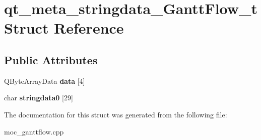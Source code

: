 \hypertarget{structqt__meta__stringdata___gantt_flow__t}{}\section{qt\+\_\+meta\+\_\+stringdata\+\_\+\+Gantt\+Flow\+\_\+t Struct Reference}
\label{structqt__meta__stringdata___gantt_flow__t}
\subsection*{Public Attributes}
\begin{DoxyCompactItemize}
\item 
\hypertarget{structqt__meta__stringdata___gantt_flow__t_a8116996fb3a46fad828986cef0447fb6}{}Q\+Byte\+Array\+Data {\bfseries data} \mbox{[}4\mbox{]}\label{structqt__meta__stringdata___gantt_flow__t_a8116996fb3a46fad828986cef0447fb6}

\item 
\hypertarget{structqt__meta__stringdata___gantt_flow__t_aa1f6294d12182c1458eba7fdbb25736b}{}char {\bfseries stringdata0} \mbox{[}29\mbox{]}\label{structqt__meta__stringdata___gantt_flow__t_aa1f6294d12182c1458eba7fdbb25736b}

\end{DoxyCompactItemize}


The documentation for this struct was generated from the following file\+:\begin{DoxyCompactItemize}
\item 
moc\+\_\+ganttflow.\+cpp\end{DoxyCompactItemize}
